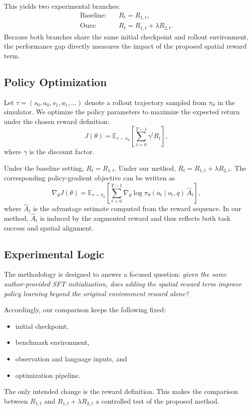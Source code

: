 This yields two experimental branches:
\begin{align}
    \text{Baseline:} \quad & R_t = R_{1,t}, \\
    \text{Ours:} \quad & R_t = R_{1,t} + \lambda R_{2,t}.
\end{align}
Because both branches share the same initial checkpoint and rollout environment, the performance gap directly measures the impact of the proposed spatial reward term.

\subsection{Policy Optimization}

Let $\tau = (s_0, a_0, s_1, a_1, \dots)$ denote a rollout trajectory sampled from $\pi_\theta$ in the simulator.
We optimize the policy parameters to maximize the expected return under the chosen reward definition:
\begin{equation}
    J(\theta)
    = \mathbb{E}_{\tau \sim \pi_\theta}
    \left[
        \sum_{t=0}^{T-1} \gamma^t R_t
    \right],
\end{equation}
where $\gamma$ is the discount factor.

Under the baseline setting, $R_t = R_{1,t}$.
Under our method, $R_t = R_{1,t} + \lambda R_{2,t}$.
The corresponding policy-gradient objective can be written as
\begin{equation}
    \nabla_\theta J(\theta)
    =
    \mathbb{E}_{\tau \sim \pi_\theta}
    \left[
        \sum_{t=0}^{T-1}
        \nabla_\theta \log \pi_\theta(a_t \mid o_t, q)\,
        \hat{A}_t
    \right],
\end{equation}
where $\hat{A}_t$ is the advantage estimate computed from the reward sequence.
In our method, $\hat{A}_t$ is induced by the augmented reward and thus reflects both task success and spatial alignment.

\subsection{Experimental Logic}

The methodology is designed to answer a focused question:
\emph{given the same author-provided SFT initialization, does adding the spatial reward term improve policy learning beyond the original environment reward alone?}

Accordingly, our comparison keeps the following fixed:
\begin{itemize}
    \item initial checkpoint,
    \item benchmark environment,
    \item observation and language inputs, and
    \item optimization pipeline.
\end{itemize}
The only intended change is the reward definition.
This makes the comparison between $R_{1,t}$ and $R_{1,t} + \lambda R_{2,t}$ a controlled test of the proposed method.
